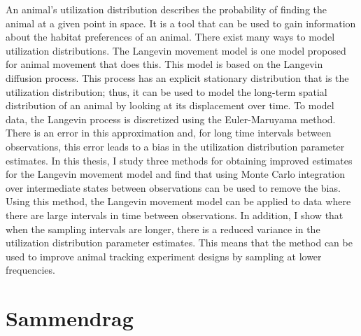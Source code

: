 

An animal's utilization distribution describes the probability of finding the animal at a given point in space. It is a tool that can be used to gain information about the habitat preferences of an animal. There exist many ways to model utilization distributions. The Langevin movement model is one model proposed for animal movement that does this. This model is based on the Langevin diffusion process. This process has an explicit stationary distribution that is the utilization distribution; thus, it can be used to model the long-term spatial distribution of an animal by looking at its displacement over time. To model data, the Langevin process is discretized using the Euler-Maruyama method. There is an error in this approximation and, for long time intervals between observations, this error leads to a bias in the utilization distribution parameter estimates. In this thesis, I study three methods for obtaining improved estimates for the Langevin movement model and find that using Monte Carlo integration over intermediate states between observations can be used to remove the bias. Using this method, the Langevin movement model can be applied to data where there are large intervals in time between observations. In addition, I show that when the sampling intervals are longer, there is a reduced variance in the utilization distribution parameter estimates. This means that the method can be used to improve animal tracking experiment designs by sampling at lower frequencies. 






\newpage
\null
\thispagestyle{empty}
\newpage

\chapter*{Sammendrag}













\newpage
\null
\thispagestyle{empty}
\newpage